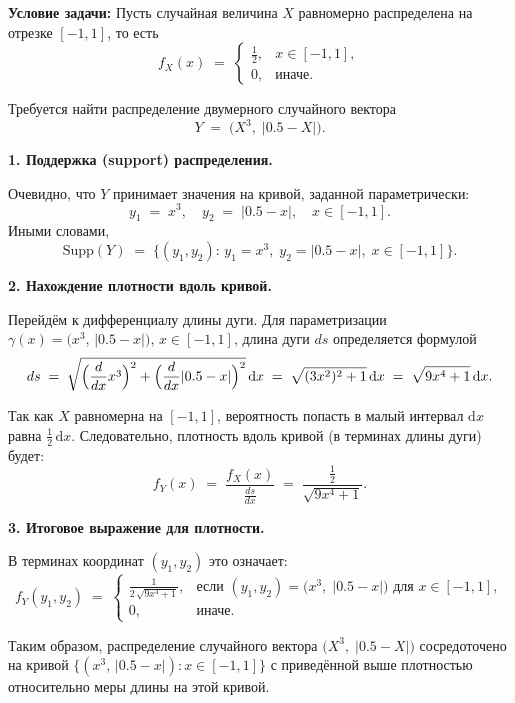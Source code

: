 \documentclass{article}
\begin{document}
\textbf{Условие задачи:} Пусть случайная величина \( X \) равномерно распределена на отрезке \([-1,1]\), то есть
\[
   f_X(x) \;=\;
   \begin{cases}
      \tfrac12, & x \in [-1,1],\\[4pt]
      0, & \text{иначе}.
   \end{cases}
\]

Требуется найти распределение двумерного случайного вектора
\[
   Y \;=\; \bigl( X^3,\;\lvert 0.5 - X\rvert \bigr).
\]

\textbf{1. Поддержка (support) распределения.}

Очевидно, что \( Y \) принимает значения на кривой, заданной параметрически:
\[
   y_1 \;=\; x^3,
   \quad
   y_2 \;=\; \lvert 0.5 - x \rvert,
   \quad
   x \in [-1,1].
\]
Иными словами,
\[
   \mathrm{Supp}(Y) \;=\; \bigl\{ (y_1,y_2):\, y_1 = x^3,\; y_2 = |0.5 - x|,\; x \in [-1,1] \bigr\}.
\]

\textbf{2. Нахождение плотности вдоль кривой.}

Перейдём к дифференциалу длины дуги. Для параметризации
\(\gamma(x) = \bigl(x^3,\,|0.5 - x|\bigr)\), \(x \in [-1,1]\), длина дуги \(ds\) определяется формулой
\[
   ds \;=\; \sqrt{\Bigl(\frac{d}{dx}x^3\Bigr)^2 +
   \Bigl(\frac{d}{dx}|0.5 - x|\Bigr)^2}\,\mathrm{d}x
   \;=\; \sqrt{(3x^2)^2 + 1}\,\mathrm{d}x
   \;=\; \sqrt{9x^4 + 1}\,\mathrm{d}x.
\]

Так как \( X \) равномерна на \([-1,1]\), вероятность попасть в малый интервал \(\mathrm{d}x\) равна \(\tfrac12\,\mathrm{d}x\). Следовательно, плотность вдоль кривой (в терминах длины дуги) будет:
\[
   f_Y(x) \;=\;
   \frac{ f_X(x) }{ \frac{ds}{dx} }
   \;=\;
   \frac{ \tfrac12 }{ \sqrt{9x^4 + 1} }.
\]

\textbf{3. Итоговое выражение для плотности.}

В терминах координат \((y_1,y_2)\) это означает:
\[
   f_Y(y_1,y_2) \;=\;
   \begin{cases}
     \displaystyle
     \frac{1}{2\,\sqrt{9x^4 + 1}},
     & \text{если }(y_1,y_2) = \bigl(x^3,\;|0.5 - x|\bigr)\text{ для } x\in[-1,1],\\[6pt]
     0, & \text{иначе}.
   \end{cases}
\]

Таким образом, распределение случайного вектора \(\bigl(X^3,\;|0.5 - X|\bigr)\) сосредоточено на кривой \(\{(x^3,\,|0.5 - x|) : x\in[-1,1]\}\) с приведённой выше плотностью относительно меры длины на этой кривой.
\end{document}
